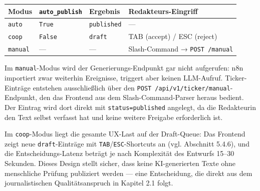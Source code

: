 {\def\LTcaptype{none} %
\begin{longtable}[]{@{}
  >{\raggedright\arraybackslash}p{}
  >{\raggedright\arraybackslash}p{}
  >{\raggedright\arraybackslash}p{}
  >{\raggedright\arraybackslash}p{}@{}}
\toprule\noalign{}
\begin{minipage}[b]{\linewidth}\raggedright
Modus
\end{minipage} & \begin{minipage}[b]{\linewidth}\raggedright
\texttt{auto\_publish}
\end{minipage} & \begin{minipage}[b]{\linewidth}\raggedright
Ergebnis
\end{minipage} & \begin{minipage}[b]{\linewidth}\raggedright
Redakteurs-Eingriff
\end{minipage} \\
\midrule\noalign{}
\endhead
\bottomrule\noalign{}
\endlastfoot
\texttt{auto} & \texttt{True} & \texttt{published} & --- \\
\texttt{coop} & \texttt{False} & \texttt{draft} & TAB (accept) / ESC
(reject) \\
\texttt{manual} & --- & --- & Slash-Command → \texttt{POST\ /manual} \\
\end{longtable}
}

Im \texttt{manual}-Modus wird der Generierungs-Endpunkt gar nicht
aufgerufen: n8n importiert zwar weiterhin Ereignisse, triggert aber
keinen LLM-Aufruf. Ticker-Einträge entstehen ausschließlich über den
\texttt{POST\ /api/v1/ticker/manual}-Endpunkt, den das Frontend aus dem
Slash-Command-Parser heraus bedient. Der Eintrag wird dort direkt mit
\texttt{status=published} angelegt, da die Redakteurin den Text selbst
verfasst hat und keine weitere Freigabe erforderlich ist.

Im \texttt{coop}-Modus liegt die gesamte UX-Last auf der Draft-Queue:
Das Frontend zeigt neue \texttt{draft}-Einträge mit
\texttt{TAB}/\texttt{ESC}-Shortcuts an (vgl. Abschnitt 5.4.6), und die
Entscheidungs-Latenz beträgt je nach Komplexität des Entwurfs 15--30
Sekunden. Dieses Design stellt sicher, dass keine KI-generierten Texte
ohne menschliche Prüfung publiziert werden --- eine Entscheidung, die
direkt aus dem journalistischen Qualitätsanspruch in Kapitel 2.1 folgt.

